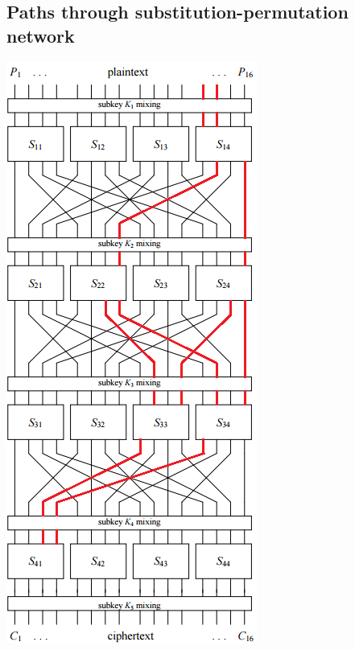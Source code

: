 \documentclass[british,11pt,a4paper]{article}
\begin{document}
\begin{appendices}
  \section{Paths through substitution-permutation network}\label{app:paths}
  \includegraphics{12,12288}

\end{appendices}
\end{document}
